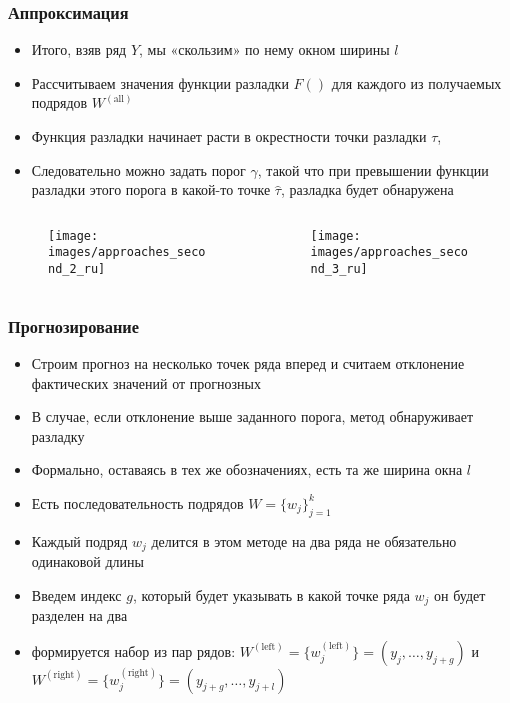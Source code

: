 \documentclass[intlimits, 9pt, unicode]{beamer}
\begin{document}
\begin{frame}
    \frametitle{Аппроксимация}

\begin{itemize}
	\item Итого, взяв ряд $Y$, мы «скользим» по нему окном ширины $l$
	\item Рассчитываем значения функции разладки $F()$ для каждого из получаемых подрядов $W^{\mathrm{(all)}}$
	\item Функция разладки начинает расти в окрестности точки разладки $\tau$,
	\item Следовательно можно задать порог $\gamma$, такой что при превышении функции разладки этого порога в какой-то точке $\hat{\tau}$, разладка будет обнаружена
\end{itemize}

 \begin{columns}
    \begin{column}{0.5\textwidth}
	\begin{figure}
	\texttt{[image: images/approaches\_second\_2\_ru]}
	\end{figure}
     \end{column}
    \begin{column}{0.5\textwidth}
	\begin{figure}
	\texttt{[image: images/approaches\_second\_3\_ru]}
	\end{figure}
     \end{column}
     \end{columns}

\end{frame}


\begin{frame}
    \frametitle{Прогнозирование}

\begin{itemize}
	\item Строим прогноз на несколько точек ряда вперед и считаем отклонение фактических значений от прогнозных
	\item В случае, если отклонение выше заданного порога, метод обнаруживает разладку
	\item Формально, оставаясь в тех же обозначениях, есть та же ширина окна $l$ 
	\item Есть последовательность подрядов $W = \{ w_j \}_{j=1}^k$
	\item  Каждый подряд  $w_j$ делится в этом методе на два ряда не обязательно одинаковой длины
	\item  Введем индекс $g$, который будет указывать в какой точке ряда $w_j$ он будет разделен на два
	\item  формируется набор из пар рядов:  $ W^{\mathrm{(left)}} = \{w_j^{\mathrm{(left)}} \}  =  (y_j, \dots, y_{j+g})$ и $W^{\mathrm{(right)}} = \{w_j^{\mathrm{(right)}} \} = (y_{j+g}, \dots, y_{j+l})$
\end{itemize}

\end{frame}
\end{document}
